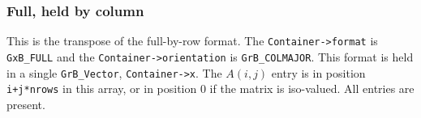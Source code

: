 \subsubsection{Full, held by column}
\label{format_full_by_col}

This is the transpose of the full-by-row format.
The \verb'Container->format' is \verb'GxB_FULL' and the
\verb'Container->orientation' is \verb'GrB_COLMAJOR'.  This format is held in a
single \verb'GrB_Vector', \verb'Container->x'.  The $A(i,j)$ entry is in
position \verb'i+j*nrows' in this array, or in position 0 if the matrix is
iso-valued.  All entries are present.

